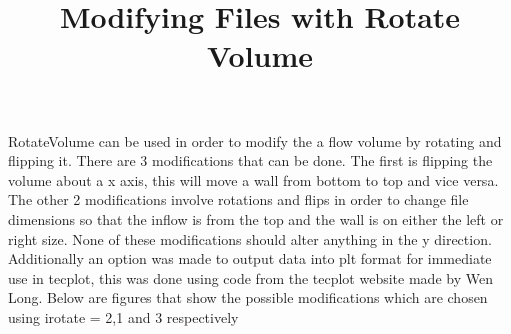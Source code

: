 \documentclass[12pt, oneside]{article}
\title{Modifying Files with Rotate Volume}
\author{}
\begin{document}
\maketitle



RotateVolume can be used in order to modify the a flow volume by rotating and flipping it. There are 3 modifications that can be done. 
The first is flipping the volume about a x axis, this will move a wall from bottom to top and vice versa. The other 2 modifications involve rotations and flips in order to
change file dimensions so that the inflow is from the top and the wall is on either the left or right size. None of these modifications should alter anything in the y direction.
Additionally an option was made to output data into plt format for immediate use in tecplot, this was done using code from the tecplot website made by Wen Long. 
Below are figures that show the possible modifications which are chosen using irotate = 2,1 and 3 respectively 
\end{document}
